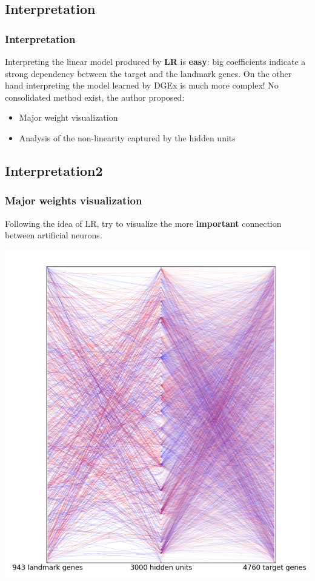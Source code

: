 \documentclass[professionalfont]{beamer}
\begin{document}
    \subsection{Interpretation}
      \begin{frame}
	       \frametitle{Interpretation}
         Interpreting the linear model produced by \textbf{LR} is \textbf{easy}:
         big coefficients indicate a strong dependency between the target and the
         landmark genes.\newline
         \newline
         On the other hand interpreting the model learned by DGEx is much more
         complex!\newline
         No consolidated method exist, the author proposed:
         \begin{itemize}
           \item Major weight visualization
           \item Analysis of the non-linearity captured by the hidden units
         \end{itemize}
      \end{frame}

    \subsection{Interpretation2}
      \begin{frame}
        \frametitle{Major weights visualization}
          Following the idea of LR, try to visualize the more \textbf{important}
          connection between artificial neurons.\newline
          \begin{center}
            \includegraphics[scale=0.3]{figures/weight1.png}
          \end{center}

      \end{frame}
\end{document}
